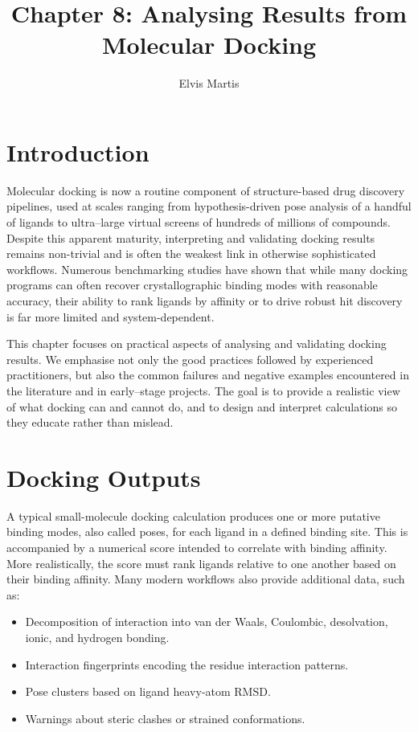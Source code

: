 \documentclass[12pt]{article}
\title{Chapter 8: Analysing Results from Molecular Docking}
\author{Elvis Martis}
\date{}
\begin{document}
\maketitle

\section{Introduction}

Molecular docking is now a routine component of structure-based drug discovery pipelines, used at scales ranging from hypothesis-driven pose analysis of a handful of ligands to ultra–large virtual screens of hundreds of millions of compounds. Despite this apparent maturity, interpreting and validating docking results remains non-trivial and is often the weakest link in otherwise sophisticated workflows. Numerous benchmarking studies have shown that while many docking programs can often recover crystallographic binding modes with reasonable accuracy, their ability to rank ligands by affinity or to drive robust hit discovery is far more limited and system-dependent\cite{CH8_Warren2006,CH8_Kitchen2004,CH8_Cheng2009}.

This chapter focuses on practical aspects of analysing and validating docking results. We emphasise not only the good practices followed by experienced practitioners, but also the common failures and negative examples encountered in the literature and in early–stage projects. The goal is to provide a realistic view of what docking can and cannot do, and to design and interpret calculations so they educate rather than mislead.

\section{Docking Outputs}

A typical small-molecule docking calculation produces one or more putative binding modes, also called poses, for each ligand in a defined binding site. This is accompanied by a numerical score intended to correlate with binding affinity. More realistically, the score must rank ligands relative to one another based on their binding affinity\cite{CH8_Kitchen2004,CH8_Huang2011}. Many modern workflows also provide additional data, such as:

\begin{itemize}
  \item Decomposition of interaction into van der Waals, Coulombic, desolvation, ionic, and hydrogen bonding.
  \item Interaction fingerprints encoding the residue interaction patterns\cite{CH8_bouysset2021prolif}.
  \item Pose clusters based on ligand heavy-atom RMSD.
  \item Warnings about steric clashes or strained conformations.
\end{itemize}
\end{document}

